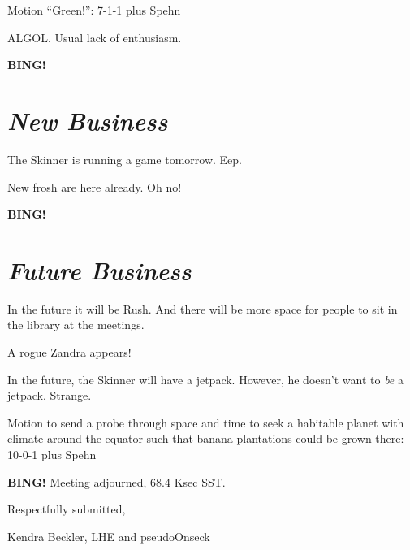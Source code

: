 \documentclass[10pt]{article}
\newcommand{\bing}{{\bf BING!} }
\newcommand{\goto}[1]{\bing \vskip 12pt \section*{{\em{#1}}}}
\newcommand{\ps}{ plus Spehn\xspace}
\newcommand{\onseck}{Kendra Beckler, LHE and pseudoOnseck}
\begin{document}
Motion ``Green!'': 7-1-1 \ps

ALGOL.  Usual lack of enthusiasm.

\goto{New Business}

The Skinner is running a game tomorrow.  Eep.

New frosh are here already.  Oh no!

\goto{Future Business}

In the future it will be Rush.  And there will be more space for people to sit in the library at the meetings.

A rogue Zandra appears!

In the future, the Skinner will have a jetpack.  However, he doesn't want to \textit{be} a jetpack.  Strange.

Motion to send a probe through space and time to seek a habitable planet with climate around the equator such that banana plantations could be grown there: 10-0-1 \ps

\bing
\noindent
Meeting adjourned, 68.4 Ksec SST.

\vspace{18pt}

\centerline{Respectfully submitted,}
\centerline{\onseck}
\end{document}
